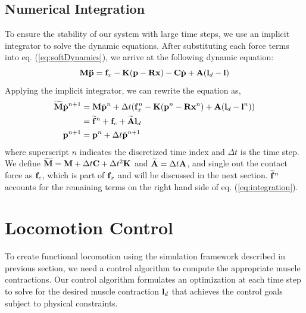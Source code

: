 \subsection{Numerical Integration}
To ensure the stability of our system with large time steps, we use an
implicit integrator to solve the dynamic equations. After substituting
each force terms into eq. (\ref{eq:softDynamics}), we arrive at the following
dynamic equation:
\begin{equation}
\mathbf{M\ddot{p}}=\mathbf{f}_x-\mathbf{K}(\mathbf{p} -\mathbf{R}\mathbf{x}) -
\mathbf{C}\dot{\mathbf{p}} +\mathbf{A}(\mathbf{l}_d - \mathbf{l})
\end{equation}
Applying the implicit integrator, we can rewrite the equation as,
\begin{align}
\label{eq:integration}
\widetilde{\vc{M}}\dot{\vc{p}}^{n+1} & = \vc{M}\dot{\vc{p}}^{n} +
\Delta t(\vc{f}^n_{x} - \vc{K}(\vc{p}^n-\vc{R}\vc{x}^n)
+\vc{A}(\vc{l}_d-\vc{l}^n)) \nonumber \\
 & = \widetilde{\vc{f}}^n + \vc{f}_c + \widetilde{\vc{A}} \vc{l}_d \\
 \vc{p}^{n+1}& = \vc{p}^{n}+\Delta t \dot{\vc{p}}^{n+1}
\label{eq:nextState}
\end{align}
where superscript $n$ indicates the discretized time index and $\Delta
t$ is the time step. We define $\widetilde{\mathbf{M}}=\mathbf{M}+\Delta t\mathbf{C}+\Delta t^2\mathbf{K}$ and $\widetilde{\mathbf{A}}=\Delta t\mathbf{A}$, and
single out the contact force as $\mathbf{f}_c$, which is part of
$\mathbf{f}_x$ and will be discussed in the next
section. $\widetilde{\mathbf{f}}^n$ accounts for the remaining terms on
the right hand side of eq. (\ref{eq:integration}).


\section{Locomotion Control}
\label{sec:softControl}

To create functional locomotion using the simulation framework described
in previous section, we need a control algorithm to compute the appropriate
muscle contractions. Our control algorithm formulates an optimization at
each time step to solve for the desired muscle contraction $\mathbf{l}_d$ that
achieves the control goals subject to physical constraints.

